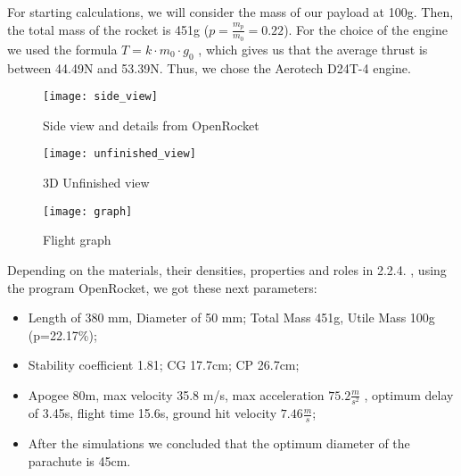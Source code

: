 For starting calculations, we will consider the mass of our payload at 100g. Then, the total mass of the rocket is 451g ($ p = \frac{m_p}{m_0} = 0.22 $). For the choice of the engine we used the formula $ T = k \cdot m_0 \cdot g_0 $ , which gives us that the average thrust is between 44.49N and 53.39N.  Thus, we chose the Aerotech D24T-4 engine.

\begin{multicols}{2}

\begin{figure}[H]
\centering
\texttt{[image: side\_view]}
\caption{Side view and details from OpenRocket}
\end{figure}

\begin{figure}[H]
\centering
\texttt{[image: unfinished\_view]}
\caption{3D Unfinished view}
\end{figure}

\end{multicols}

\begin{figure}[H]
\centering
\texttt{[image: graph]}
\caption{Flight graph}
\end{figure}

Depending on the materials, their densities, properties and roles in 2.2.4. , using the program OpenRocket, we got these next parameters:

\begin{itemize}

\item Length of 380 mm, Diameter of 50 mm; Total Mass 451g, Utile Mass 100g (p=22.17\%);
\item Stability coefficient 1.81; CG 17.7cm; CP 26.7cm;
\item Apogee 80m, max velocity 35.8 m/s, max acceleration $ 75.2 \frac{m}{s^2} $ , optimum delay of 3.45s, flight time 15.6s, ground hit velocity $ 7.46 \frac{m}{s} $;
\item After the simulations we concluded that the optimum diameter of the parachute is 45cm. 

\end{itemize}